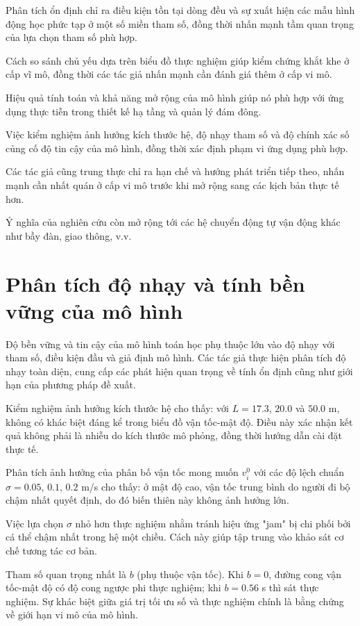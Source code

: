 \documentclass[12pt,a4paper]{article}
\begin{document}
Phân tích ổn định chỉ ra điều kiện tồn tại dòng đều và sự xuất hiện các mẫu hình động học phức tạp ở một số miền tham số, đồng thời nhấn mạnh tầm quan trọng của lựa chọn tham số phù hợp.

Cách so sánh chủ yếu dựa trên biểu đồ thực nghiệm giúp kiểm chứng khắt khe ở cấp vĩ mô, đồng thời các tác giả nhấn mạnh cần đánh giá thêm ở cấp vi mô.

Hiệu quả tính toán và khả năng mở rộng của mô hình giúp nó phù hợp với ứng dụng thực tiễn trong thiết kế hạ tầng và quản lý đám đông.

Việc kiểm nghiệm ảnh hưởng kích thước hệ, độ nhạy tham số và độ chính xác số củng cố độ tin cậy của mô hình, đồng thời xác định phạm vi ứng dụng phù hợp.

Các tác giả cũng trung thực chỉ ra hạn chế và hướng phát triển tiếp theo, nhấn mạnh cần nhất quán ở cấp vi mô trước khi mở rộng sang các kịch bản thực tế hơn.

Ý nghĩa của nghiên cứu còn mở rộng tới các hệ chuyển động tự vận động khác như bầy đàn, giao thông, v.v.

\section{Phân tích độ nhạy và tính bền vững của mô hình}

Độ bền vững và tin cậy của mô hình toán học phụ thuộc lớn vào độ nhạy với tham số, điều kiện đầu và giả định mô hình. Các tác giả thực hiện phân tích độ nhạy toàn diện, cung cấp các phát hiện quan trọng về tính ổn định cũng như giới hạn của phương pháp đề xuất.

Kiểm nghiệm ảnh hưởng kích thước hệ cho thấy: với $L = 17.3$, $20.0$ và $50.0$ m, không có khác biệt đáng kể trong biểu đồ vận tốc-mật độ. Điều này xác nhận kết quả không phải là nhiễu do kích thước mô phỏng, đồng thời hướng dẫn cài đặt thực tế.

Phân tích ảnh hưởng của phân bố vận tốc mong muốn $v_i^0$ với các độ lệch chuẩn $\sigma = 0.05$, $0.1$, $0.2$ m/s cho thấy: ở mật độ cao, vận tốc trung bình do người đi bộ chậm nhất quyết định, do đó biến thiên này không ảnh hưởng lớn.

Việc lựa chọn $\sigma$ nhỏ hơn thực nghiệm nhằm tránh hiệu ứng "jam" bị chi phối bởi cá thể chậm nhất trong hệ một chiều. Cách này giúp tập trung vào khảo sát cơ chế tương tác cơ bản.

Tham số quan trọng nhất là $b$ (phụ thuộc vận tốc). Khi $b = 0$, đường cong vận tốc-mật độ có độ cong ngược phi thực nghiệm; khi $b = 0.56$ s thì sát thực nghiệm. Sự khác biệt giữa giá trị tối ưu số và thực nghiệm chính là bằng chứng về giới hạn vi mô của mô hình.
\end{document}
